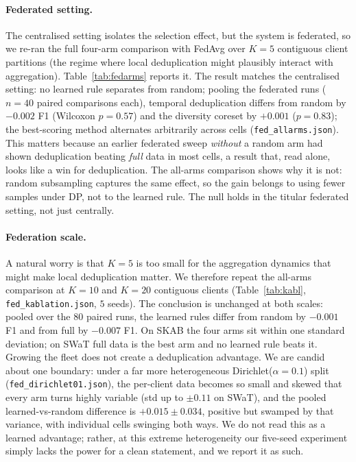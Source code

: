 \documentclass[pdflatex,sn-mathphys-num]{sn-jnl}
\theoremstyle{thmstyleone}
\theoremstyle{thmstyletwo}
\theoremstyle{thmstylethree}
\begin{document}
\paragraph{Federated setting.} The centralised setting isolates the
selection effect, but the system is federated, so we re-ran the full four-arm
comparison with FedAvg over $K{=}5$ contiguous client partitions (the regime where
local deduplication might plausibly interact with aggregation). Table~\ref{tab:fedarms}
reports it. The result matches the centralised setting: no learned rule separates from random; pooling
the federated runs ($n{=}40$ paired comparisons each), temporal deduplication differs
from random by $-0.002$ F1 (Wilcoxon $p=0.57$) and the diversity coreset by $+0.001$
($p=0.83$); the best-scoring method alternates arbitrarily across cells
(\texttt{fed\_allarms.json}).
This matters because an earlier federated sweep \emph{without} a random arm had shown
deduplication beating \emph{full} data in most cells, a result that, read alone,
looks like a win for deduplication. The all-arms comparison shows why it is not:
random subsampling captures the same effect, so the gain belongs to using fewer
samples under DP, not to the learned rule. The null holds in the titular federated
setting, not just centrally.

\paragraph{Federation scale.} A natural worry is that $K{=}5$ is too small for the
aggregation dynamics that might make local deduplication matter. We therefore repeat
the all-arms comparison at $K{=}10$ and $K{=}20$ contiguous clients
(Table~\ref{tab:kabl}, \texttt{fed\_kablation.json}, $5$ seeds). The conclusion is
unchanged at both scales: pooled over the $80$ paired runs, the learned rules differ
from random by $-0.001$ F1 and from full by $-0.007$ F1. On SKAB the four arms sit
within one standard deviation; on SWaT full data is the best arm and no learned rule
beats it. Growing the fleet does not create a deduplication advantage. We are candid
about one boundary: under a far more heterogeneous Dirichlet($\alpha{=}0.1$) split
(\texttt{fed\_dirichlet01.json}), the per-client data becomes so small and skewed that
every arm turns highly variable (std up to $\pm0.11$ on SWaT), and the pooled
learned-vs-random difference is $+0.015\pm0.034$, positive but swamped by that
variance, with individual cells swinging both ways. We do not read this as a learned
advantage; rather, at this extreme heterogeneity our five-seed experiment simply lacks
the power for a clean statement, and we report it as such.
\end{document}
